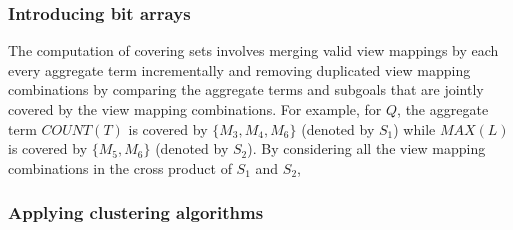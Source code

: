 \begin{example}
\subsubsection{Introducing bit arrays}
The computation of covering sets involves merging valid view mappings by each every aggregate term incrementally and removing duplicated view mapping combinations by comparing the aggregate terms and subgoals that are jointly covered by the view mapping combinations. For example, for $Q$, the aggregate term $COUNT(T)$ is covered by $\{M_3, M_4, M_6\}$ (denoted by $S_1$) while $MAX(L)$ is covered by $\{M_5, M_6\}$ (denoted by $S_2$). By considering all the view mapping combinations in the cross product of $S_1$ and $S_2$, 


\subsubsection{Applying clustering algorithms}






\end{example}